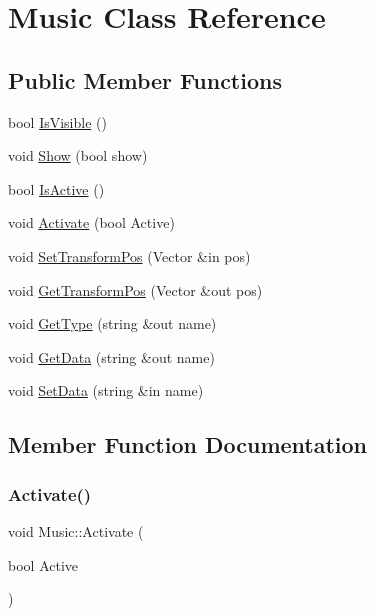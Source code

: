 \hypertarget{class_music}{}\section{Music Class Reference}
\label{class_music}
\subsection*{Public Member Functions}
\begin{DoxyCompactItemize}
\item 
bool \hyperlink{class_music_af623044781215aff628e9b5b83a26706}{Is\+Visible} ()
\item 
void \hyperlink{class_music_a1ab196a28fc48f7fc133e1ea05a2fcc7}{Show} (bool show)
\item 
bool \hyperlink{class_music_a7d9f11b35101c07fb38cc49efc4e1e16}{Is\+Active} ()
\item 
void \hyperlink{class_music_af5d2dc21246ca7cb499e475b25c60855}{Activate} (bool Active)
\item 
void \hyperlink{class_music_aef95bd94c4f71e1f8bbcd9ab898e908e}{Set\+Transform\+Pos} (Vector \&in pos)
\item 
void \hyperlink{class_music_a30722cdb3ace99a39b73369b24a6346e}{Get\+Transform\+Pos} (Vector \&out pos)
\item 
void \hyperlink{class_music_a0f87a2494872304af8b73690c3e28a15}{Get\+Type} (string \&out name)
\item 
void \hyperlink{class_music_a06d06ae121cbaea733ae7f0dcff8052d}{Get\+Data} (string \&out name)
\item 
void \hyperlink{class_music_a298086f3bbf606b25a06545062aa30e9}{Set\+Data} (string \&in name)
\end{DoxyCompactItemize}


\subsection{Member Function Documentation}
\hypertarget{class_music_af5d2dc21246ca7cb499e475b25c60855}{}\label{class_music_af5d2dc21246ca7cb499e475b25c60855} 
\subsubsection{\texorpdfstring{Activate()}{Activate()}}
{\footnotesize\ttfamily void Music\+::\+Activate (\begin{DoxyParamCaption}\item[{bool}]{Active }\end{DoxyParamCaption})}

